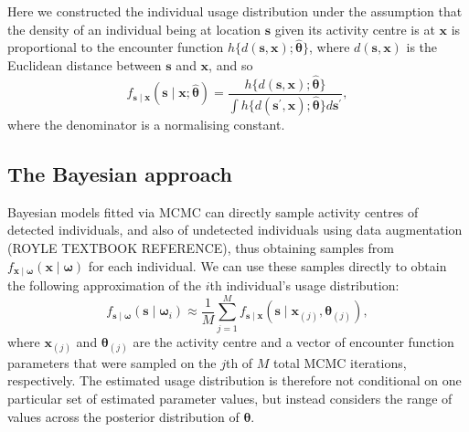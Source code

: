 \documentclass[10pt,a4paper]{article}\usepackage[]{graphicx}\usepackage[]{color}
\begin{document}
 Here we constructed
the individual usage distribution under the assumption that the
density of an individual being at location $\bm{s}$ given its activity
centre is at $\bm{x}$ is proportional to the encounter function
$h\{d(\bm{s}, \bm{x}); \widehat{\bm{\theta}}\}$, where $d(\bm{s},
\bm{x})$ is the Euclidean distance between $\bm{s}$ and $\bm{x}$, and
so
\begin{equation}
  f_{\bm{s} \mid \bm{x}}(\bm{s} \mid \bm{x}; \widehat{\bm{\theta}}) = \frac{h\{d(\bm{s}, \bm{x}); \widehat{\bm{\theta}}\}}{\int h\{d(\bm{s}^\prime, \bm{x}); \widehat{\bm{\theta}}\} d\bm{s}^\prime},
\end{equation}
where the denominator is a normalising constant.
\subsection{The Bayesian approach}

Bayesian models fitted via MCMC can directly sample activity centres
of detected individuals, and also of undetected individuals using data
augmentation (ROYLE TEXTBOOK REFERENCE), thus obtaining samples from
$f_{\bm{x} \mid \bm{\omega}}(\bm{x} \mid \bm{\omega})$ for each
individual. We can use these samples directly to obtain the following
approximation of the $i$th individual's usage distribution:
\begin{equation}
  f_{\bm{s} \mid \bm{\omega}}(\bm{s} \mid \bm{\omega}_i) \approx
  \frac{1}{M} \sum_{j = 1}^M f_{\bm{s} \mid \bm{x}}(\bm{s} \mid
  \bm{x}_{(j)}, \bm{\theta}_{(j)}),
\end{equation}
where $\bm{x}_{(j)}$ and $\bm{{\theta}}_{(j)}$ are the activity centre
and a vector of encounter function parameters that were sampled on the
$j$th of $M$ total MCMC iterations, respectively. The
estimated usage distribution is therefore not conditional on one
particular set of estimated parameter values, but instead considers
the range of values across the posterior distribution of
$\bm{\theta}$.
\end{document}
